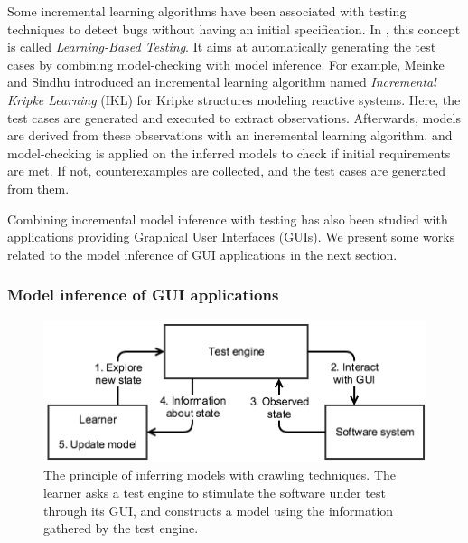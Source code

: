 Some incremental learning algorithms have been associated with
testing techniques to detect bugs without having an initial
specification. In \cite{Meinke:2004:ABT:1007512.1007532,tap2011},
this concept is called \textit{Learning-Based Testing}. It aims
at automatically generating the test cases by combining
model-checking with model inference. For example, Meinke and
Sindhu \cite{tap2011} introduced an incremental learning
algorithm named \textit{Incremental Kripke Learning} (IKL) for
Kripke structures modeling reactive systems. Here, the test
cases are generated and executed to extract observations.
Afterwards, models are derived from these observations with an
incremental learning algorithm, and model-checking is applied on
the inferred models to check if initial requirements are met. If
not, counterexamples are collected, and the test cases are
generated from them.

Combining incremental model inference with testing has also been
studied with applications providing Graphical User Interfaces
(GUIs). We present some works related to the model inference of
GUI applications in the next section.

\subsubsection{Model inference of GUI applications}
\label{sec:active-crawling}

\begin{figure}[ht]
    \begin{center}
        \includegraphics[width=0.9\linewidth]{figures/crawler.png}
    \end{center}

    \caption{The principle of inferring models with crawling
    techniques. The learner asks a test engine to stimulate the
	software under test through its GUI, and constructs a model
	using the information gathered by the test engine.}
    \label{fig:crawler}
\end{figure}

